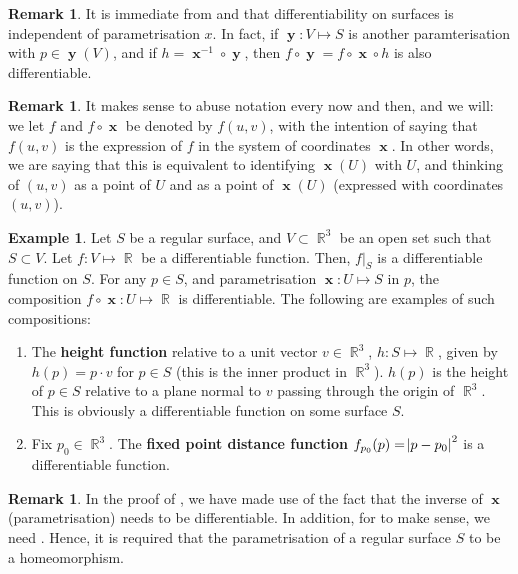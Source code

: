 \documentclass{amsart} %
\theoremstyle{mytheoremstyle}
\theoremstyle{definition}
\newtheorem{example}[definition]{Example}
\newtheorem{remark}[definition]{Remark}
\numberwithin{equation}{section}
\DeclareMathOperator{\R}{\mathbb{R}}
\DeclareMathOperator{\1}{\mathbbm{1}}
\DeclareMathOperator{\x}{\mathbf{x}}
\DeclareMathOperator{\y}{\mathbf{y}}
\begin{document}
\begin{remark}
	It is immediate from  and  that differentiability on surfaces is independent of parametrisation $x$. In fact, if $\y: V \mapsto S$ is another paramterisation with $p \in \y(V)$, and if $h = \x^{-1} \circ \y$, then $f \circ \y = f \circ \x \circ h$ is also differentiable.
\end{remark}

\begin{remark}
	It makes sense to abuse notation every now and then, and we will: we let $f$ and $f \circ \x$ be denoted by $f(u,v)$, with the intention of saying that $f(u,v)$ is the expression of $f$ in the system of coordinates $\x$. In other words, we are saying that this is equivalent to identifying $\x(U)$ with $U$, and thinking of $(u,v)$ as a point of $U$ and as a point of $\x(U)$ (expressed with coordinates $(u,v)$). 
\end{remark}


\begin{example}
	\label{exampledistancesinR3}
	Let $S$ be a regular surface, and $V \subset \R^3$ be an open set such that $S \subset V$. Let $f: V \mapsto \R$ be a differentiable function. Then, $f|_{S}$ is a differentiable function on $S$. For any $p \in S$, and parametrisation $\x: U \mapsto S $ in $p$, the composition $f \circ \x: U \mapsto \R$ is differentiable. The following are examples of such compositions:
	
	\begin{enumerate}
		\item The \textbf{height function} relative to a unit vector $v \in \R^3$, $h: S \mapsto \R$, given by $h(p) = p \cdot v$ for $p \in S$ (this is the inner product in $\R^3$). $h(p)$ is the height of $p \in S$ relative to a plane normal to $v$ passing through the origin of $\R^3$. This is obviously a differentiable function on some surface $S$.
		
		\item Fix $p_0 \in \R^3$. The \textbf{fixed point distance function} $f_{p_0} (p)  = \abs{p-p_0}^2$ is a differentiable function.
	\end{enumerate}
\end{example}


\begin{remark}
	In the proof of , we have made use of the fact that the inverse of $\x$ (parametrisation) needs to be differentiable. In addition, for  to make sense, we need . Hence, it is required that the parametrisation of a regular surface $S$ to be a homeomorphism.
\end{remark}
\end{document}
